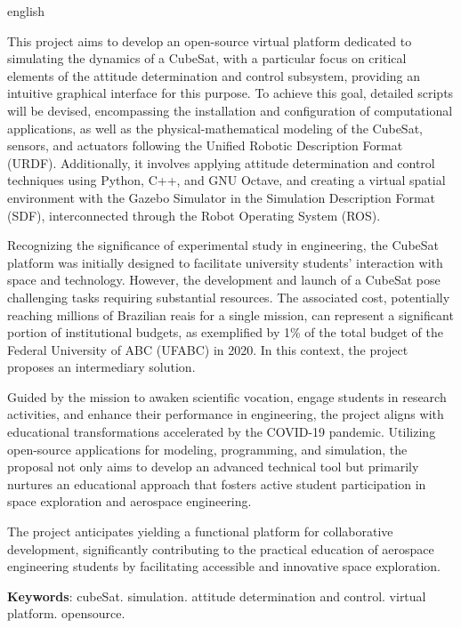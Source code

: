 \begin{resumo}[Abstract]
 \begin{otherlanguage*}{english}
 
This project aims to develop an open-source virtual platform dedicated to simulating the dynamics of a CubeSat, with a particular focus on critical elements of the attitude determination and control subsystem, providing an intuitive graphical interface for this purpose. To achieve this goal, detailed scripts will be devised, encompassing the installation and configuration of computational applications, as well as the physical-mathematical modeling of the CubeSat, sensors, and actuators following the Unified Robotic Description Format (URDF). Additionally, it involves applying attitude determination and control techniques using Python, C++, and GNU Octave, and creating a virtual spatial environment with the Gazebo Simulator in the Simulation Description Format (SDF), interconnected through the Robot Operating System (ROS).

Recognizing the significance of experimental study in engineering, the CubeSat platform was initially designed to facilitate university students' interaction with space and technology. However, the development and launch of a CubeSat pose challenging tasks requiring substantial resources. The associated cost, potentially reaching millions of Brazilian reais for a single mission, can represent a significant portion of institutional budgets, as exemplified by 1\% of the total budget of the Federal University of ABC (UFABC) in 2020. In this context, the project proposes an intermediary solution.

Guided by the mission to awaken scientific vocation, engage students in research activities, and enhance their performance in engineering, the project aligns with educational transformations accelerated by the COVID-19 pandemic. Utilizing open-source applications for modeling, programming, and simulation, the proposal not only aims to develop an advanced technical tool but primarily nurtures an educational approach that fosters active student participation in space exploration and aerospace engineering.

The project anticipates yielding a functional platform for collaborative development, significantly contributing to the practical education of aerospace engineering students by facilitating accessible and innovative space exploration.

   \vspace{\onelineskip}
 
   \noindent 
   \textbf{Keywords}:     cubeSat. simulation. attitude determination and control. virtual platform. opensource.
 \end{otherlanguage*}
\end{resumo}